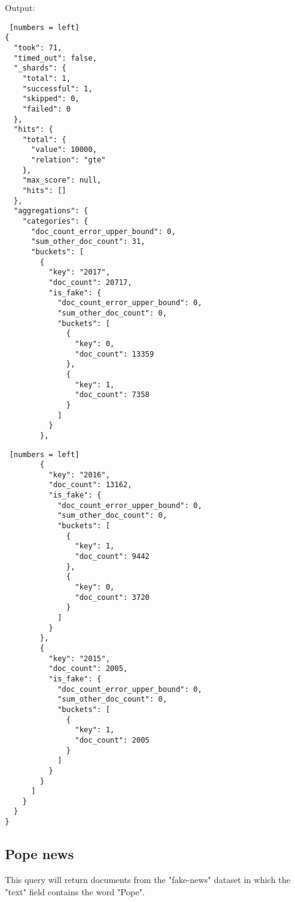 Output:
\begin{algorithm}[h!]
\caption{2016/2017/2018 fake/true news}
\begin{lstlisting} [numbers = left]
{
  "took": 71,
  "timed_out": false,
  "_shards": {
    "total": 1,
    "successful": 1,
    "skipped": 0,
    "failed": 0
  },
  "hits": {
    "total": {
      "value": 10000,
      "relation": "gte"
    },
    "max_score": null,
    "hits": []
  },
  "aggregations": {
    "categories": {
      "doc_count_error_upper_bound": 0,
      "sum_other_doc_count": 31,
      "buckets": [
        {
          "key": "2017",
          "doc_count": 20717,
          "is_fake": {
            "doc_count_error_upper_bound": 0,
            "sum_other_doc_count": 0,
            "buckets": [
              {
                "key": 0,
                "doc_count": 13359
              },
              {
                "key": 1,
                "doc_count": 7358
              }
            ]
          }
        },

\end{lstlisting}
\end{algorithm}
\newpage
\begin{algorithm}[h!]
\caption{2016/2017/2018 fake/true news}
\begin{lstlisting} [numbers = left]
        {
          "key": "2016",
          "doc_count": 13162,
          "is_fake": {
            "doc_count_error_upper_bound": 0,
            "sum_other_doc_count": 0,
            "buckets": [
              {
                "key": 1,
                "doc_count": 9442
              },
              {
                "key": 0,
                "doc_count": 3720
              }
            ]
          }
        },
        {
          "key": "2015",
          "doc_count": 2005,
          "is_fake": {
            "doc_count_error_upper_bound": 0,
            "sum_other_doc_count": 0,
            "buckets": [
              {
                "key": 1,
                "doc_count": 2005
              }
            ]
          }
        }
      ]
    }
  }
}

\end{lstlisting}
\end{algorithm}
\newpage
\subsection{Pope news}
This query will return documents from the "fake-news" dataset in which the "text" field contains the word "Pope".\\

